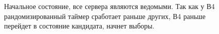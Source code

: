 \documentclass[subf, href, colorlinks=true, 14pt,
times, mtpro, specialist]{disser}
\theoremstyle{definition}
\begin{document}
\begin{figure}[H]
\begin{minipage}[h]{0.46\linewidth}
\begin{small}
Начальное состояние, все сервера являются ведомыми. Так как у В4 рандомизированный таймер сработает раньше других, В4 раньше перейдет в состояние кандидата, начнет выборы. \\
\end{small}
\end{minipage}
\hfill
\begin{minipage}[h]{0.46\linewidth}
\vspace{-0.2cm}
 \\

\end{minipage}
\end{figure}
\end{document}
